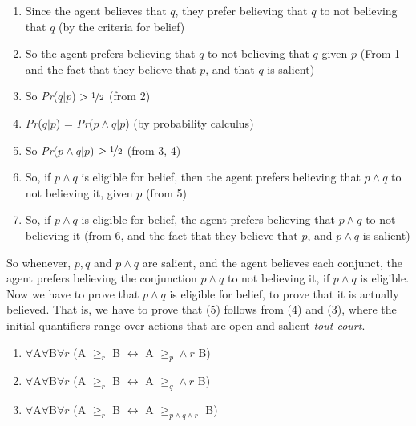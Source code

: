 \begin{enumerate}
\item Since the agent believes that \(q\), they prefer believing that \(q\) to not believing that \(q\) (by the criteria for belief)
\item So the agent prefers believing that \(q\) to not believing that \(q\) given \(p\) (From 1 and the fact that they believe that \(p\), and that \(q\) is salient)
\item So \textit{Pr}(\(q | p\)) \(> \nicefrac{1}{2}\) (from 2)
\item \textit{Pr}(\(q | p\)) = \textit{Pr}(\(p \wedge q | p\)) (by probability calculus)
\item So \textit{Pr}(\(p \wedge q | p\)) \(> \nicefrac{1}{2}\) (from 3, 4)
\item So, if \(p \wedge q\) is eligible for belief, then the agent prefers believing that \(p \wedge q\) to not believing it, given \(p\) (from 5)
\item So, if \(p \wedge q\) is eligible for belief, the agent prefers believing that \(p \wedge q\) to not believing it (from 6, and the fact that they believe that \(p\), and \(p \wedge q\) is salient)
\end{enumerate}

\noindent So whenever, \(p, q\) and \(p \wedge q\) are salient, and the agent believes each conjunct, the agent prefers believing the conjunction \(p \wedge q\) to not believing it, if \(p \wedge q\) is eligible. Now we have to prove that \(p \wedge q\) is eligible for belief, to prove that it is actually believed. That is, we have to prove that (5) follows from (4) and (3), where the initial quantifiers range over actions that are open and salient \textit{tout court}.

\begin{enumerate}
\renewcommand{\labelenumi}{(\arabic{enumi})}
\setcounter{enumi}{2}
\item \(\forall\)A\(\forall\)B\(\forall r\) (A \(\geq_r\) B \(\leftrightarrow\) A \(\geq _p  \wedge r\) B)
\item \(\forall\)A\(\forall\)B\(\forall r\) (A \(\geq_r\) B \(\leftrightarrow\) A \(\geq _q  \wedge r\) B)
\item \(\forall\)A\(\forall\)B\(\forall r\) (A \(\geq_r\) B \(\leftrightarrow\) A \(\geq _{p \wedge q \wedge r}\) B)
\end{enumerate}

